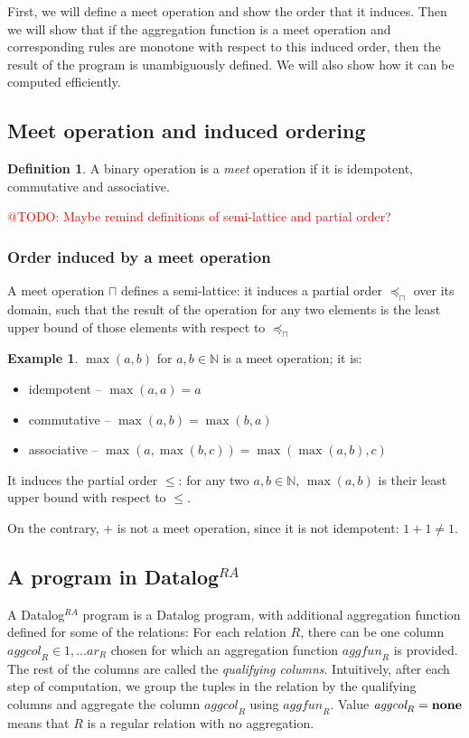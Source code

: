 \documentclass{pracamgr}
\makeatletter
\theoremstyle{plain}
\theoremstyle{definition}
\newtheorem{defn}{Definition}[section]
\newtheorem{exmp}{Example}[section]
\theoremstyle{remark}
\newcommand{\todo}[1]{\textcolor{red}{@TODO: #1}}
\newcommand{\datalogra}{Datalog$^{RA}$ }
\newcommand{\aggfun}{\textit{aggfun} }
\newcommand{\aggcol}{\textit{aggcol} }
\makeatother
\begin{document}
First, we will define a meet operation and show the order that it induces. Then we will show that if the aggregation function is a meet operation and corresponding rules are monotone with respect to this induced order, then the result of the program is unambiguously defined. We will also show how it can be computed efficiently.

\subsection{Meet operation and induced ordering}
\begin{defn}
A binary operation is a \emph{meet} operation if it is idempotent, commutative and associative.
\end{defn}
\todo{Maybe remind definitions of semi-lattice and partial order?}

\subsubsection{Order induced by a meet operation}

A meet operation $\sqcap$ defines a semi-lattice: it induces a partial order $\preceq_\sqcap$ over its domain, such that the result of the operation for any two elements is the least upper bound of those elements with respect to $\preceq_\sqcap$

\begin{exmp}
$\max(a, b)$ for $a, b \in \mathbb{N}$ is a meet operation; it is:
\begin{itemize}
\item idempotent -- $\max(a, a) = a$
\item commutative -- $\max(a, b) = \max(b, a)$
\item associative -- $\max(a, \max(b, c)) = \max(\max(a, b), c)$
\end{itemize}
It induces the partial order $\le$: for any two $a, b \in \mathbb{N}$, $\max(a, b)$ is their least upper bound with respect to $\le$.


On the contrary, $+$ is not a meet operation, since it is not idempotent: $1+1 \ne 1$.
\end{exmp}

\subsection{A program in \datalogra}
A \datalogra program is a Datalog program, with additional aggregation function defined for some of the relations:
For each relation $R$, there can be one column $\aggcol_R \in {1, \dots ar_R}$ chosen for which an aggregation function $\aggfun_R$ is provided. The rest of the columns are called the \emph{qualifying columns}. Intuitively, after each step of computation, we group the tuples in the relation by the qualifying columns and aggregate the column $\aggcol_R$ using $\aggfun_R$. Value $\aggcol_R = \bf{none}$ means that $R$ is a regular relation with no aggregation.
\end{document}
